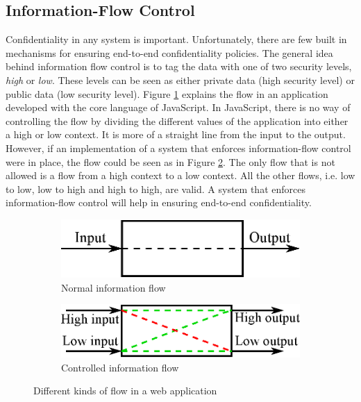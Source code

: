 \subsection{Information-Flow Control}
Confidentiality in any system is important. Unfortunately, there are few built in mechanisms for ensuring end-to-end confidentiality policies.\cite{ifc-jsac} The general idea behind information flow control is to tag the data with one of two security levels, \emph{high} or \emph{low}. These levels can be seen as either private data (high security level) or public data (low security level). Figure \ref{fig:normal_flow} explains the flow in an application developed with the core language of JavaScript. In JavaScript, there is no way of controlling the flow by dividing the different values of the application into either a high or low context. It is more of a straight line from the input to the output. However, if an implementation of a system that enforces information-flow control were in place, the flow could be seen as in Figure \ref{fig:controlled_flow}. The only flow that is not allowed is a flow from a high context to a low context. All the other flows, i.e. low to low, low to high and high to high, are valid. A system that enforces information-flow control will help in ensuring end-to-end confidentiality.

\begin{figure}
  \begin{subfigure}{.5\textwidth}
    \includegraphics[scale=0.65]{images/flow_normal.eps}
    \caption{Normal information flow}
    \label{fig:normal_flow}
  \end{subfigure}
  \begin{subfigure}{.5\textwidth}
    \includegraphics[scale=0.65]{images/flow_controlled.eps}
    \caption{Controlled information flow}
    \label{fig:controlled_flow}
  \end{subfigure}
  \caption{Different kinds of flow in a web application}
  \label{fig:flows}
\end{figure}

